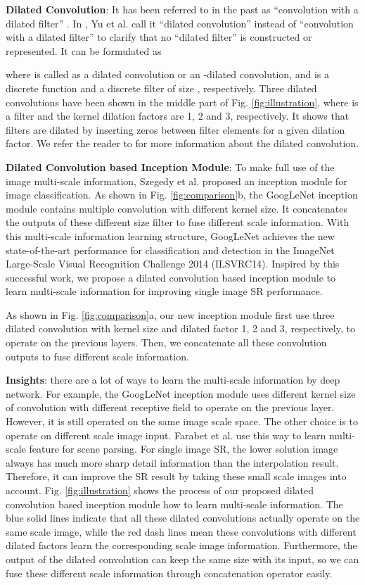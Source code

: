 \documentclass{article}
\begin{document}
\textbf{Dilated Convolution}: It has been referred to in the past as “convolution with a dilated filter” \cite{ref11, ref12}. In \cite{ref13}, Yu et al. call it “dilated convolution” instead of “convolution with a dilated filter” to clarify that no “dilated filter” is constructed or represented. It can be formulated as

where  is called as a dilated convolution or an -dilated convolution,  and  is a discrete function and a discrete filter of size , respectively. Three dilated convolutions have been shown in the middle part of Fig. \ref{fig:illustration}, where  is a  filter and the kernel dilation factors are 1, 2 and 3, respectively. It shows that filters are dilated by inserting  zeros between filter elements for a given dilation factor. We refer the reader to \cite{ref13} for more information about the dilated convolution.

\textbf{Dilated Convolution based Inception Module}: To make full use of the image multi-scale information, Szegedy et al. \cite{ref14} proposed an inception module for image classification. As shown in Fig. \ref{fig:comparison}b, the GoogLeNet inception module contains multiple convolution with different kernel size. It concatenates the outputs of these different size filter to fuse different scale information. With this multi-scale information learning structure, GoogLeNet achieves the new state-of-the-art performance for classification and detection in the ImageNet Large-Scale Visual Recognition Challenge 2014 (ILSVRC14). Inspired by this successful work, we propose a dilated convolution based inception module to learn multi-scale information for improving single image SR performance.

As shown in Fig. \ref{fig:comparison}a, our new inception module first use three dilated convolution with kernel size  and dilated factor 1, 2 and 3, respectively, to operate on the previous layers. Then, we concatenate all these convolution outputs to fuse different scale information.

\textbf{Insights}: there are a lot of ways to learn the multi-scale information by deep network. For example, the GoogLeNet inception module uses different kernel size of convolution with different receptive field to operate on the previous layer. However, it is still operated on the same image scale space. The other choice is to operate on different scale image input. Farabet et al. \cite{ref15} use this way to learn multi-scale feature for scene parsing. For single image SR, the lower solution image always has much more sharp detail information than the interpolation result. Therefore, it can improve the SR result by taking these small scale images into account. Fig. \ref{fig:illustration} shows the process of our proposed dilated convolution based inception module how to learn multi-scale information. The blue solid lines indicate that all these dilated convolutions actually operate on the same scale image, while the red dash lines mean these convolutions with different dilated factors learn the corresponding scale image information. Furthermore, the output of the dilated convolution can keep the same size with its input, so we can fuse these different scale information through concatenation operator easily.
\end{document}
